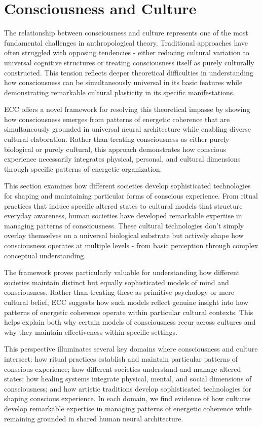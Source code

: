 \section{Consciousness and Culture}

The relationship between consciousness and culture represents one of the most fundamental challenges in anthropological theory. Traditional approaches have often struggled with opposing tendencies - either reducing cultural variation to universal cognitive structures or treating consciousness itself as purely culturally constructed. This tension reflects deeper theoretical difficulties in understanding how consciousness can be simultaneously universal in its basic features while demonstrating remarkable cultural plasticity in its specific manifestations.

ECC offers a novel framework for resolving this theoretical impasse by showing how consciousness emerges from patterns of energetic coherence that are simultaneously grounded in universal neural architecture while enabling diverse cultural elaboration. Rather than treating consciousness as either purely biological or purely cultural, this approach demonstrates how conscious experience necessarily integrates physical, personal, and cultural dimensions through specific patterns of energetic organization.

This section examines how different societies develop sophisticated technologies for shaping and maintaining particular forms of conscious experience. From ritual practices that induce specific altered states to cultural models that structure everyday awareness, human societies have developed remarkable expertise in managing patterns of consciousness. These cultural technologies don't simply overlay themselves on a universal biological substrate but actively shape how consciousness operates at multiple levels - from basic perception through complex conceptual understanding.

The framework proves particularly valuable for understanding how different societies maintain distinct but equally sophisticated models of mind and consciousness. Rather than treating these as primitive psychology or mere cultural belief, ECC suggests how such models reflect genuine insight into how patterns of energetic coherence operate within particular cultural contexts. This helps explain both why certain models of consciousness recur across cultures and why they maintain effectiveness within specific settings.

This perspective illuminates several key domains where consciousness and culture intersect: how ritual practices establish and maintain particular patterns of conscious experience; how different societies understand and manage altered states; how healing systems integrate physical, mental, and social dimensions of consciousness; and how artistic traditions develop sophisticated technologies for shaping conscious experience. In each domain, we find evidence of how cultures develop remarkable expertise in managing patterns of energetic coherence while remaining grounded in shared human neural architecture.

